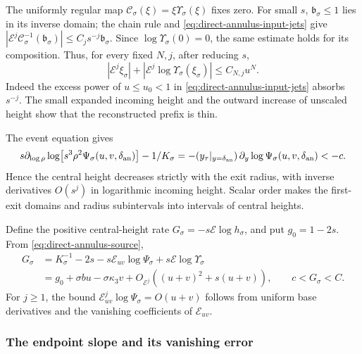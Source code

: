 The uniformly regular map
$\mathcal C_\sigma(\xi)=\xi\Upsilon_\sigma(\xi)$ fixes zero.
For small $s$, $\mathfrak b_\sigma\le1$ lies in its inverse domain;
the chain rule and \eqref{eq:direct-annulus-input-jets} give
$|\mathcal E^j\mathcal C_\sigma^{-1}(\mathfrak b_\sigma)|
\le C_js^{-j}\mathfrak b_\sigma$. Since
$\log\Upsilon_\sigma(0)=0$, the same estimate holds for its composition.
Thus, for every fixed $N,j$,
after reducing $s$,
\begin{equation}
\label{eq:direct-annulus-prefix-weight}
 |\mathcal E^j\xi_\sigma|
       +|\mathcal E^j\log\Upsilon_\sigma(\xi_\sigma)|
                         \le C_{N,j}u^N .
\end{equation}
Indeed the excess power of $u\le u_0<1$ in
\eqref{eq:direct-annulus-input-jets} absorbs $s^{-j}$.
The small expanded incoming height and the outward increase of
unscaled height show that the reconstructed prefix is thin.

The event equation gives
\[
 s\partial_{\log\rho}
       \log\bigl[s^3\rho^2\Psi_\sigma(u,v,\delta_{\rm an})\bigr]
       -1/K_\sigma
 =-(y_\tau|_{y=\delta_{\rm an}})\,
                      \partial_y\log\Psi_\sigma(u,v,\delta_{\rm an})<-c.
\]
Hence the central height decreases strictly with the exit radius, with inverse
derivatives \(O(s^j)\) in logarithmic incoming height. Scalar order
makes the first-exit domains and radius subintervals into intervals of
central heights.

Define the positive central-height rate
\(G_\sigma=-s\mathcal E\log h_\sigma\), and put
\(g_0=1-2s\). From \eqref{eq:direct-annulus-source},
\begin{equation}
\label{eq:direct-annulus-source-rate}
 \begin{split}
 G_\sigma&=K_\sigma^{-1}-2s
       -s\mathcal E_{uv}\log\Psi_\sigma
       +s\mathcal E\log\Upsilon_\sigma\\
 &=g_0+\sigma bu-\sigma\kappa_3 v
        +O_{\mathcal E^j}((u+v)^2+s(u+v)),\qquad c<G_\sigma<C .
 \end{split}
\end{equation}
For \(j\ge1\), the bound
\(\mathcal E_{uv}^j\log\Psi_\sigma=O(u+v)\) follows from
uniform base derivatives and the vanishing coefficients of
\(\mathcal E_{uv}\).

\subsubsection{The endpoint slope and its vanishing error}

